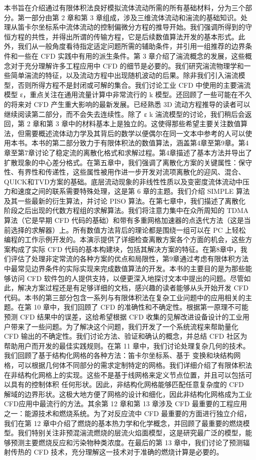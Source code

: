 \documentclass[11pt,a4paper,openany,fontset=none]{ctexbook}
\begin{document}
本书旨在介绍通过有限体积法良好模拟流体流动所需的所有基础材料，分为三个部分。第一部分由第 2 章和第 3 章组成，涉及三维流体流动和湍流的基础知识。处理从笛卡尔坐标系中流体流动的控制偏微分方程的推导开始。我们强调所得到的守恒方程的共性，并得出所谓的传输方程，它是后续数值算法开发的基本形式。此外，我们从一般角度看待指定适定问题所需的辅助条件，并引用一组推荐的边界条件和一些在 CFD 实践中有用的派生条件。第 3 章介绍了湍流概念的发展，这些概念对于充分理解许多工程应用中 CFD 的细节是必要的。我们研究湍流物理学和一些简单湍流的特征，以及流动方程中出现随机波动的后果。除非我们引入湍流模型，否则所得方程不是封闭或可解的集合。我们讨论工业 CFD 中使用的主要湍流模型 ε，重点关注在通用流量计算中非常流行的 k 模型。还回顾了一些可能在不久的将来对 CFD 产生重大影响的最新发展。已经熟悉 3D 流动方程推导的读者可以继续阅读第二部分，而不会失去连续性。除了
ε k 湍流模型的讨论，我们稍后会返回，第 2 章和第 3 章中的材料基本上是独立的。这使得那些希望主要关注数值算法，但需要概述流体动力学及其背后的数学以便偶尔在同一文本中参考的人可以使用本书。本书的第二部分致力于有限体积法的数值算法，涵盖第4章至第9章。第4章至第7章讨论了稳定流的离散化格式和求解过程。第4章描述了基本方法并导出了扩散现象的中心差分格式。在第五章中，我们强调了离散化方案的关键属性：保守性、有界性和传递性，这些属性被用作进一步开发对流项离散化的迎风、混合、QUICK和TVD方案的基础。底层流动现象的非线性性质以及变密度流体流动中压力和速度之间的联系需要特殊处理，这是第 6 章的主题。我们介绍 SIMPLE 算法及其一些最新的衍生算法，并讨论 PISO 算法。在第七章中，我们描述了离散化阶段之后出现的代数方程组的求解算法。我们将注意力集中在众所周知的 TDMA 算法（它是早期 CFD 代码的基础）和带有多重网格加速器的点迭代方法（这是当前选择的求解器）上。所有数值方法背后的理论都是围绕一组可以在 PC 上轻松编程的工作示例开发的。本演示提供了详细检查离散方案各个方面的机会，这些方案构成了实际 CFD 代码的基本构建块，包括其解决方案的特征。在第8章中，我们评估了处理非定常流的各种方案的优点和局限性，第9章通过考虑有限体积方法中最常见边界条件的实际实现来完成数值算法的开发。本书的主要目的是为那些能够访问 CFD 软件包的人提供支持，以便更深入地探讨文本中提出的问题。尽管如此，解决方案过程还是有足够详细的文档，感兴趣的读者能够从头开始开发 CFD 代码。本书的第三部分包含一系列与有限体积法在复杂工业问题中的应用相关的主题。在第 10 章中，我们回顾了 CFD 的准确性和不确定性。根据第一原理不可能预测 CFD 结果中的误差，这给希望根据 CFD 收集的见解改进设备设计的工业用户带来了一些问题。为了解决这个问题，我们开发了一个系统流程来帮助量化 CFD 输出的不确定性。我们讨论方法、验证和确认的概念，并总结 CFD 社区为帮助用户而开发的最佳实践规则。在第 11 章中，我们讨论处理复杂几何的技术。我们回顾了基于结构化网格的各种方法：笛卡尔坐标系、基于 变换和块结构网格，可以根据几何体不同部分的需求定制特定的网格。我们详细介绍了有限体积法在非结构化网格上的实现。这些不是基于线网格来定义节点位置，并且可以包括可以具有的控制体积
任何形状。因此，非结构化网格能够匹配任意复杂度的 CFD 解域的边界形状。这极大地方便了网格的设计和细化，因此非结构化网格成为工业CFD应用中最流行的方法。其余第 12 章和第 13 章涉及 CFD 最重要的工程应用之一：能源技术和燃烧系统。为了对反应流中 CFD 最重要的方面进行独立介绍，我们在第 12 章中介绍了燃烧的基本热力学和化学概念，并回顾了最重要的燃烧模型。我们特别关注非预混湍流燃烧的层流火焰面模型，这是研究最广泛的模型，能够预测主要燃烧反应和污染物种类浓度。在最后的第 13 章中，我们讨论了预测辐射传热的 CFD 技术，充分理解这一技术对于准确的燃烧计算是必要的。
\end{document}
